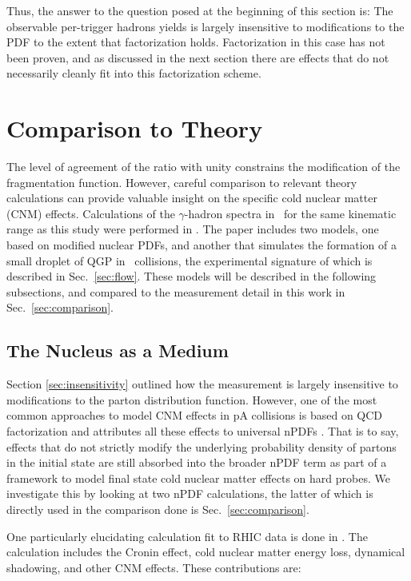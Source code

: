 Thus, the answer to the question posed at the beginning of this section is: The observable per-trigger hadrons yields is largely insensitive to modifications to the PDF  to the extent that factorization holds. Factorization in this case has not been proven, and as discussed in the next section there are effects that do not necessarily cleanly fit into this factorization scheme.

\section{Comparison to Theory}
The  level of agreement of the ratio with unity constrains the modification of the fragmentation function. However, careful comparison to relevant theory calculations can provide valuable insight on the specific cold nuclear matter (CNM) effects. Calculations of the $\gamma$-hadron spectra in \pPb~for the same kinematic range as this study were performed in \cite{Xie2021}. The paper includes two models, one based on modified nuclear PDFs, and another that simulates the formation of a small droplet of QGP in \pPb~collisions, the experimental signature of which is described in Sec.~\ref{sec:flow}. These models will be described in the following subsections, and compared to the measurement detail in this work in Sec.~\ref{sec:comparison}.

\subsection{The Nucleus as a Medium}
\label{compare_cnm}

Section \ref{sec:insensitivity} outlined how the measurement is largely insensitive to modifications to the parton distribution function. However, one of the most common approaches to model CNM effects in pA collisions is based on QCD factorization and attributes all these effects to universal nPDFs \cite{Kang2012,Eskola2009a,Hirai2007}. That is to say, effects that do not strictly modify the underlying probability density of partons in the initial state are still absorbed into the broader nPDF term as part of a framework to model final state cold nuclear matter effects on hard probes. We investigate this by looking at two nPDF calculations, the latter of which is directly used in the comparison done is Sec.~\ref{sec:comparison}.
 
One particularly elucidating calculation fit to RHIC data is done in \cite{Kang2012}. The calculation includes the Cronin effect, cold nuclear matter energy loss, dynamical shadowing, and other CNM effects. These contributions are: 

